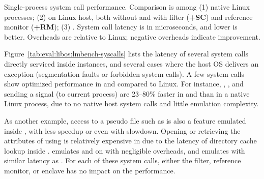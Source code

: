 \label{sec:eval:libos:syscalls}


\begin{table}[t!b!]

\caption{Single-process system call performance. Comparison is among (1) native Linux processes; (2) \graphene{} on Linux host, both without and with \seccomp{} filter ({\bf +SC}) and reference monitor ({\bf +RM}); (3) \graphenesgx{}.
System call latency is in microseconds, and lower is better.
Overheads are relative to Linux; negative overheads indicate improvement.} 
\label{tab:eval:libos:lmbench-syscalls}
\end{table}


Figure~\ref{tab:eval:libos:lmbench-syscalls}
lists the latency of several system calls directly serviced inside \thelibos{} instances,
and several cases where the host OS delivers an exception
(segmentation faults or forbidden system calls).
A few system calls show optimized performance
in \graphene{} and \graphenesgx{} compared to Linux.
For instance,
, , and sending a  signal (to current process)
are 23--80\% faster in \graphene{} and \graphenesgx{} than in a native Linux process,
due to no native host system calls and little emulation complexity.



As another example, access to a pseudo file
such as 
is also a feature emulated
inside \thelibos{},
with less speedup or even with slowdown.
Opening 
or retrieving the attributes of  using 
is relatively expensive in \graphene{}
due to the latency of directory cache lookup
inside \thelibos{}.
\thelibos{} emulates  and 
on 
with negligible overheads,
and emulates  with
similar latency as .
For each of these system calls, either the \seccomp{} filter, reference monitor, or enclave
has no impact on the performance.


